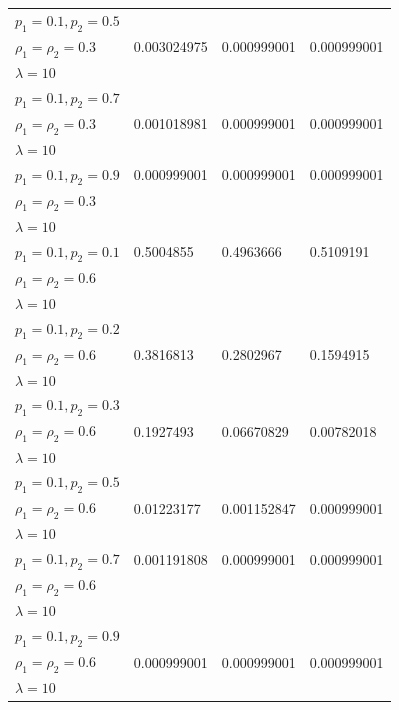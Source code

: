 \documentclass[12pt,oneside]{report}
\theoremstyle{definition}
\theoremstyle{mystyle}
\begin{document}
\begin{landscape}
\begin{center}
\begin{longtable}{|l|l|l| l|}
		$ p_{1}=0.1,p_{2}=0.5 $ & & & \\
		$ \rho_{1}=\rho_{2}=0.3 $ & 0.003024975  &0.000999001  & 0.000999001\\
		$\lambda=10$ &  &  &\\ \hline
		$ p_{1}=0.1,p_{2}=0.7$ &  &  &\\
		$ \rho_{1}=\rho_{2}=0.3 $  &0.001018981  & 0.000999001  &0.000999001\\
		$\lambda=10$ &  &  &\\ \hline
		$ p_{1}=0.1,p_{2}=0.9$ & 0.000999001 & 0.000999001  & 0.000999001\\
		$ \rho_{1}=\rho_{2}=0.3 $  &  &  &\\
		$\lambda=10$ &  &  &\\ \hline
		$ p_{1}=0.1,p_{2}=0.1$ &0.5004855   & 0.4963666  &0.5109191 \\
		$ \rho_{1}=\rho_{2}=0.6 $  &  & & \\
		$\lambda=10$ &  &  &\\ \hline
		$ p_{1}=0.1,p_{2}=0.2$ &  &  & \\ 
		$ \rho_{1}=\rho_{2}=0.6 $  &0.3816813  &0.2802967 &0.1594915 \\
		$\lambda=10$ &  &  &\\ \hline
		$ p_{1}=0.1,p_{2}=0.3$&  &  &  \\
		$ \rho_{1}=\rho_{2}=0.6 $  &0.1927493  &0.06670829 &0.00782018 \\
		$\lambda=10$ &  &  &\\ \hline
		$ p_{1}=0.1,p_{2}=0.5$ &   & & \\
		$ \rho_{1}=\rho_{2}=0.6 $  &0.01223177  &0.001152847 & 0.000999001 \\
		$\lambda=10$ &  & & \\ \hline
		$ p_{1}=0.1,p_{2}=0.7$ &0.001191808  & 0.000999001 &0.000999001 \\
		$ \rho_{1}=\rho_{2}=0.6 $  &  &  &\\
		$\lambda=10$ &  &  &\\ \hline
		$ p_{1}=0.1,p_{2}=0.9$ &   & &  \\
		$ \rho_{1}=\rho_{2}=0.6 $ &0.000999001  &0.000999001  &0.000999001\\
		$\lambda=10$ &  & & \\ \hline
		

\end{longtable}
\end{center}
\end{landscape}
\end{document}
